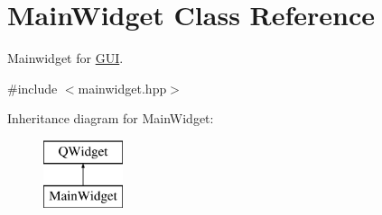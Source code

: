 \hypertarget{classMainWidget}{}\section{Main\+Widget Class Reference}
\label{classMainWidget}


Mainwidget for \mbox{\hyperlink{classGUI}{G\+UI}}.  




{\ttfamily \#include $<$mainwidget.\+hpp$>$}

Inheritance diagram for Main\+Widget\+:\begin{figure}[H]
\begin{center}
\leavevmode
\includegraphics[height=2.000000cm]{classMainWidget}
\end{center}
\end{figure}
